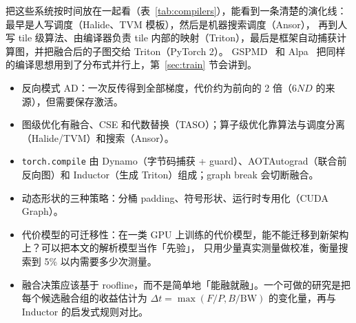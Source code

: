 把这些系统按时间放在一起看（表~\ref{tab:compilers}），能看到一条清楚的演化线：最早是人写调度（Halide、TVM 模板），然后是机器搜索调度（Ansor），
再到人写 tile 级算法、由编译器负责 tile 内部的映射（Triton），最后是框架自动捕获计算图，并把融合后的子图交给 Triton（PyTorch 2）。
GSPMD~\cite{xu2021gspmd} 和 Alpa~\cite{zheng2022alpa} 把同样的编译思想用到了分布式并行上，第~\ref{sec:train} 节会讲到。

\begin{keypts}
\begin{itemize}
\item 反向模式 AD：一次反传得到全部梯度，代价约为前向的 2 倍（$6ND$ 的来源），但需要保存激活。
\item 图级优化有融合、CSE 和代数替换（TASO）；算子级优化靠算法与调度分离（Halide/TVM）和搜索（Ansor）。
\item \texttt{torch.compile} 由 Dynamo（字节码捕获 + guard）、AOTAutograd（联合前反向图）和 Inductor（生成 Triton）组成；graph break 会切断融合。
\item 动态形状的三种策略：分桶 padding、符号形状、运行时专用化（CUDA Graph）。
\end{itemize}
\end{keypts}

\begin{research}
\begin{itemize}
\item 代价模型的可迁移性：在一类 GPU 上训练的代价模型，能不能迁移到新架构上？可以把本文的解析模型当作「先验」，
只用少量真实测量做校准，衡量搜索到 5\% 以内需要多少次测量。
\item 融合决策应该基于 roofline，而不是简单地「能融就融」。一个可做的研究是把每个候选融合组的收益估计为
$\Delta t=\max(F/P,B/\mathrm{BW})$ 的变化量，再与 Inductor 的启发式规则对比。
\end{itemize}
\end{research}

